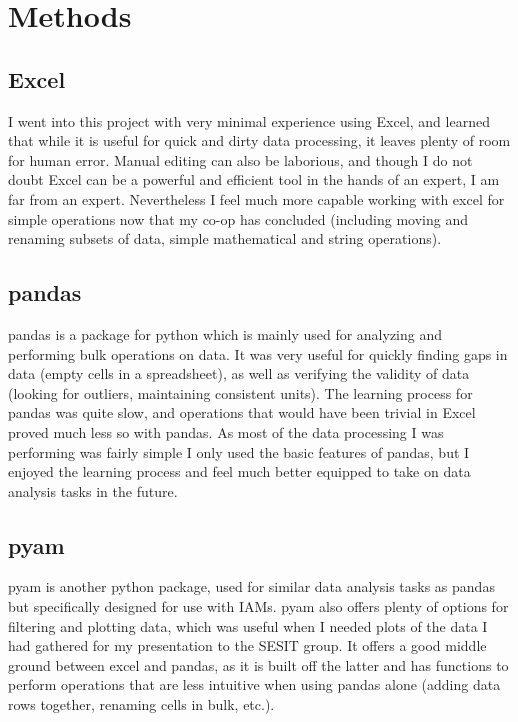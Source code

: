 \documentclass{article}
\begin{document}
\newpage

\section{Methods}

\subsection{Excel}

I went into this project with very minimal experience using Excel, and learned that while it is useful for quick and dirty data processing, it leaves plenty of room for human error. Manual editing can also be laborious, and though I do not doubt Excel can be a powerful and efficient tool in the hands of an expert, I am far from an expert. Nevertheless I feel much more capable working with excel for simple operations now that my co-op has concluded (including moving and renaming subsets of data, simple mathematical and string operations). 

\subsection*{pandas}

pandas is a package for python which is mainly used for analyzing and performing bulk operations on data. It was very useful for quickly finding gaps in data (empty cells in a spreadsheet), as well as verifying the validity of data (looking for outliers, maintaining consistent units). The learning process for pandas was quite slow, and operations that would have been trivial in Excel proved much less so with pandas. As most of the data processing I was performing was fairly simple I only used the basic features of pandas, but I enjoyed the learning process and feel much better equipped to take on data analysis tasks in the future.

\subsection{pyam}

pyam is another python package, used for similar data analysis tasks as pandas but specifically designed for use with IAMs. pyam also offers plenty of options for filtering and plotting data, which was useful when I needed plots of the data I had gathered for my presentation to the SESIT group. It offers a good middle ground between excel and pandas, as it is built off the latter and has functions to perform operations that are less intuitive when using pandas alone (adding data rows together, renaming cells in bulk, etc.).
\end{document}
